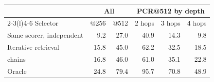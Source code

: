 \begin{tabular}{@{}lrrrrr@{}}
\toprule
 & \multicolumn{2}{c}{All} & \multicolumn{3}{c}{PCR@512 by depth} \\
\cmidrule(lr){2-3}\cmidrule(l){4-6}
Selector & @256 & @512 & 2 hops & 3 hops & 4 hops \\
\midrule
Same scorer, independent & 9.2 & 27.0 & 40.9 & 14.3 & 9.8 \\
Iterative retrieval & 15.8 & 45.0 & 62.2 & 32.5 & 18.5 \\
\proofkv{} chains & 16.8 & 46.0 & 61.0 & 35.1 & 22.8 \\
Oracle & 24.8 & 79.4 & 95.7 & 70.8 & 48.9 \\
\bottomrule
\end{tabular}
